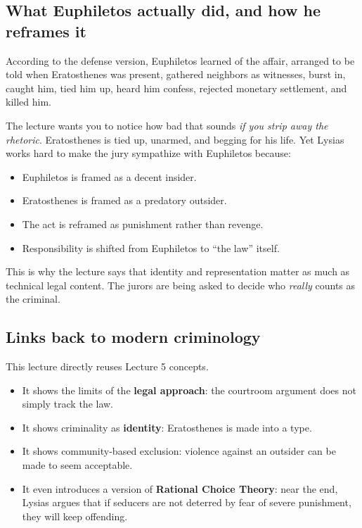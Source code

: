 \documentclass[11pt]{article}
\begin{document}
\subsection*{What Euphiletos actually did, and how he reframes it}
According to the defense version, Euphiletos learned of the affair, arranged to be told when Eratosthenes was present, gathered neighbors as witnesses, burst in, caught him, tied him up, heard him confess, rejected monetary settlement, and killed him.

The lecture wants you to notice how bad that sounds \emph{if you strip away the rhetoric}. Eratosthenes is tied up, unarmed, and begging for his life. Yet Lysias works hard to make the jury sympathize with Euphiletos because:
\begin{itemize}
\item Euphiletos is framed as a decent insider.
\item Eratosthenes is framed as a predatory outsider.
\item The act is reframed as punishment rather than revenge.
\item Responsibility is shifted from Euphiletos to ``the law'' itself.
\end{itemize}

This is why the lecture says that identity and representation matter as much as technical legal content. The jurors are being asked to decide who \emph{really} counts as the criminal.

\subsection*{Links back to modern criminology}
This lecture directly reuses Lecture 5 concepts.

\begin{itemize}
\item It shows the limits of the \textbf{legal approach}: the courtroom argument does not simply track the law.
\item It shows criminality as \textbf{identity}: Eratosthenes is made into a type.
\item It shows community-based exclusion: violence against an outsider can be made to seem acceptable.
\item It even introduces a version of \textbf{Rational Choice Theory}: near the end, Lysias argues that if seducers are not deterred by fear of severe punishment, they will keep offending.
\end{itemize}
\end{document}
